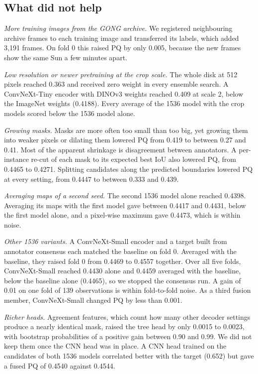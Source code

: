 \documentclass[sigconf]{acmart}
\begin{document}
\subsection{What did not help}

\emph{More training images from the GONG archive.} We registered neighbouring archive frames to each training image and transferred its labels, which added 3,191 frames. On fold 0 this raised PQ by only 0.005, because the new frames show the same Sun a few minutes apart.

\emph{Low resolution or newer pretraining at the crop scale.} The whole disk at 512 pixels reached 0.363 and received zero weight in every ensemble search. A ConvNeXt-Tiny encoder with DINOv3 weights reached 0.409 at scale 2, below the ImageNet weights (0.4188). Every average of the 1536 model with the crop models scored below the 1536 model alone.

\emph{Growing masks.} Masks are more often too small than too big, yet growing them into weaker pixels or dilating them lowered PQ from 0.419 to between 0.27 and 0.41. Most of the apparent shrinkage is disagreement between annotators. A per-instance re-cut of each mask to its expected best IoU also lowered PQ, from 0.4465 to 0.4271. Splitting candidates along the predicted boundaries lowered PQ at every setting, from 0.4447 to between 0.333 and 0.439.

\emph{Averaging maps of a second seed.} The second 1536 model alone reached 0.4398. Averaging its maps with the first model gave between 0.4417 and 0.4431, below the first model alone, and a pixel-wise maximum gave 0.4473, which is within noise.

\emph{Other 1536 variants.} A ConvNeXt-Small encoder and a target built from annotator consensus each matched the baseline on fold 0. Averaged with the baseline, they raised fold 0 from 0.4469 to 0.4557 together. Over all five folds, ConvNeXt-Small reached 0.4430 alone and 0.4459 averaged with the baseline, below the baseline alone (0.4465), so we stopped the consensus run. A gain of 0.01 on one fold of 139 observations is within fold-to-fold noise. As a third fusion member, ConvNeXt-Small changed PQ by less than 0.001.

\emph{Richer heads.} Agreement features, which count how many other decoder settings produce a nearly identical mask, raised the tree head by only 0.0015 to 0.0023, with bootstrap probabilities of a positive gain between 0.90 and 0.99. We did not keep them once the CNN head was in place. A CNN head trained on the candidates of both 1536 models correlated better with the target (0.652) but gave a fused PQ of 0.4540 against 0.4544.
\end{document}
